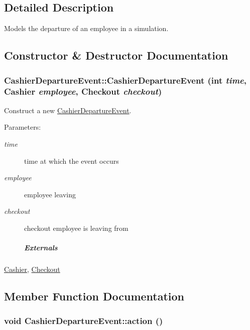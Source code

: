 \subsection{Detailed Description}
Models the departure of an employee in a simulation. 

\subsection{Constructor \& Destructor Documentation}
\hypertarget{class_cashier_departure_event_393f31367b81ce356ab721ebae00f63d}{
\subsubsection[{CashierDepartureEvent}]{\setlength{\rightskip}{0pt plus 5cm}CashierDepartureEvent::CashierDepartureEvent (int {\em time}, \/  {\bf Cashier} {\em employee}, \/  {\bf Checkout} {\em checkout})}}
\label{class_cashier_departure_event_393f31367b81ce356ab721ebae00f63d}


Construct a new \hyperlink{class_cashier_departure_event}{CashierDepartureEvent}. 

\begin{Desc}
\item[Parameters:]
\begin{description}
\item[{\em time}]time at which the event occurs \item[{\em employee}]employee leaving \item[{\em checkout}]checkout employee is leaving from \subparagraph*{Externals}\end{description}
\end{Desc}
\hyperlink{class_cashier}{Cashier}, \hyperlink{class_checkout}{Checkout} 

\subsection{Member Function Documentation}
\hypertarget{class_cashier_departure_event_58a6e618df64f71ef309786ef8a9488f}{
\subsubsection[{action}]{\setlength{\rightskip}{0pt plus 5cm}void CashierDepartureEvent::action ()}}
\label{class_cashier_departure_event_58a6e618df64f71ef309786ef8a9488f}


